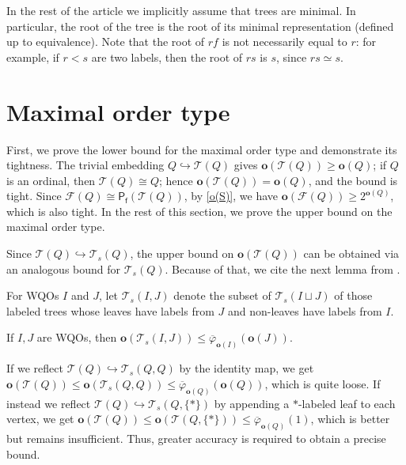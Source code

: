 \documentclass[runningheads]{llncs}
\let \leq \leqslant
\let \geq \geqslant
\let \phi \varphi
\let \embeds \hookrightarrow
\renewcommand \S [1][]{\mathsf{P_f^{#1}}}
\def \T {\mathcal{T}}
\def \F {\mathcal{F}}
\def \o {\textbf{o}}
\begin{document}
In the rest of the article we implicitly assume that trees are minimal. In particular, the root of the tree is the root of its minimal representation (defined up to equivalence). Note that the root of $rf$ is not necessarily equal to $r$: for example, if $r < s$ are two labels, then the root of $rs$ is $s$, since $rs \simeq s$.





\section{Maximal order type}\label{section o}

First, we prove the lower bound for the maximal order type and demonstrate its tightness.
The trivial embedding $Q \embeds \T(Q)$ gives $\o(\T(Q)) \geq \o(Q)$; if $Q$ is an ordinal, then $\T(Q) \cong Q$; hence $\o(\T(Q)) = \o(Q)$, and the bound is tight. Since $\F(Q) \cong \S(\T(Q))$, by \cref{o(S)}, we have $\o(\F(Q)) \geq 2^{\o(Q)}$, which is also tight. In the rest of this section, we prove the upper bound on the maximal order type.

Since $\T(Q) \embeds \T_s(Q)$, the upper bound on $\o(\T(Q))$ can be obtained via an analogous bound for $\T_s(Q)$. Because of that, we cite the next lemma from \cite{Friedman2023}.

\begin{definition}
    For WQOs $I$ and $J$, let $\T_s(I, J)$ denote the subset of $\T_s(I \sqcup J)$ of those labeled trees whose leaves have labels from $J$ and non-leaves have labels from $I$.
\end{definition}

\begin{lemma}\label{o(T(I,J))}
    If $I,J$ are WQOs, then $\o(\T_s(I, J)) \leq \overline{\phi}_{\o(I)}(\o(J))$.
\end{lemma}

If we reflect $\T(Q) \embeds \T_s(Q, Q)$ by the identity map, we get $\o(\T(Q)) \leq \o(\T_s(Q, Q)) \leq \overline{\phi}_{\o(Q)}(\o(Q))$, which is quite loose. If instead we reflect $\T(Q) \embeds \T_s(Q, \{*\})$ by appending a $*$-labeled leaf to each vertex, we get $\o(\T(Q)) \leq \o(\T(Q, \{*\})) \leq \overline{\phi}_{\o(Q)}(1)$, which is better but remains insufficient. Thus, greater accuracy is required to obtain a precise bound.
\end{document}

